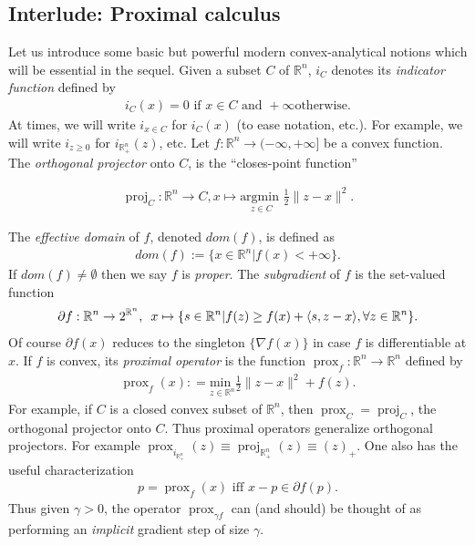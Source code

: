 \documentclass{article} %
\DeclareMathOperator{\proj}{proj}
\DeclareMathOperator{\prox}{prox}
\begin{document}
\subsection{Interlude: Proximal calculus}
Let us introduce some basic but powerful modern convex-analytical
notions which will be essential in the sequel. Given a subset $C$ of
$\mathbb{R}^n$, $i_C$ denotes its \textit{indicator function} defined
by
\begin{eqnarray}
  i_C(x) = 0 \text{ if } x \in C\text{ and }+\infty\text{
    otherwise.}
\end{eqnarray}
At times, we will write $i_{x \in C}$ for $i_C(x)$ (to ease notation,
etc.). For example, we will write $i_{z \ge 0}$ for
$i_{\mathbb{R}^n_+}(z)$, etc. Let $f : \mathbb{R}^n \rightarrow
(-\infty, +\infty]$ be a
  convex function. The \textit{orthogonal projector} onto $C$, is the
  ``closes-point function''

  \begin{eqnarray}
    \proj_C: \mathbb{R}^n \rightarrow C, x \mapsto \underset{z \in
      C}{\text{argmin }}\frac{1}{2}\|z-x\|^2.
\end{eqnarray}

The \textit{effective domain} of $f$, denoted
  $dom(f)$, is defined as
\begin{eqnarray}
  dom(f) := \{x \in \mathbb{R}^n | f(x) < +\infty\}.
\end{eqnarray}
 If $dom(f) \ne \emptyset$ then we say $f$ is \textit{proper}.
The \textit{subgradient} of $f$ is the set-valued function
\begin{eqnarray}
\partial f: \mathbb{R}^n \rightarrow 2^{\mathbb{R}^n}, \hspace{.5em} x \mapsto
\{s\in \mathbb{R}^n | f(z)  \ge f(x) + \langle s, z - x\rangle, \forall
z \in \mathbb{R}^n\}.
\end{eqnarray}
Of course $\partial f(x)$ reduces to the singleton $\{\nabla f(x)\}$
in case $f$ is differentiable at $x$. If $f$ is convex, its
\textit{proximal operator} is the function $\prox_f: \mathbb{R}^n
\rightarrow \mathbb{R}^n$ defined by
\begin{eqnarray}
  \prox_f(x): = \underset{z \in \mathbb{R}^n}{\text{min }}\frac{1}{2}\|z
  - x\|^2 + f(z).
\end{eqnarray}
For example, if $C$ is a closed convex subset of $\mathbb{R}^n$, then
$\prox_C = \proj_C$, the orthogonal projector onto $C$. Thus proximal
operators generalize orthogonal projectors. For example
$\prox_{i_{\mathbb{R}^n_+}}(z) \equiv \proj_{\mathbb{R}^n_+}(z) \equiv
(z)_+$. One also has the useful characterization
\begin{eqnarray}
  p = \prox_f(x)\text{ iff } x - p \in \partial f(p).
\end{eqnarray}
Thus given $\gamma > 0$, the operator $\prox_{\gamma f}$ can (and
should) be thought of as performing an \textit{implicit} gradient step
of size $\gamma$.
\end{document}
